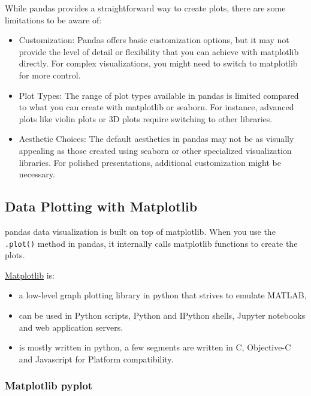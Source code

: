 \documentclass[
  letterpaper,
  DIV=11,
  numbers=noendperiod]{scrreprt}
\providecommand{\tightlist}{%
  \setlength{\itemsep}{0pt}\setlength{\parskip}{0pt}}\usepackage{longtable,booktabs,array}
\begin{document}
While pandas provides a straightforward way to create plots, there are
some limitations to be aware of:

\begin{itemize}
\item
  Customization: Pandas offers basic customization options, but it may
  not provide the level of detail or flexibility that you can achieve
  with matplotlib directly. For complex visualizations, you might need
  to switch to matplotlib for more control.
\item
  Plot Types: The range of plot types available in pandas is limited
  compared to what you can create with matplotlib or seaborn. For
  instance, advanced plots like violin plots or 3D plots require
  switching to other libraries.
\item
  Aesthetic Choices: The default aesthetics in pandas may not be as
  visually appealing as those created using seaborn or other specialized
  visualization libraries. For polished presentations, additional
  customization might be necessary.
\end{itemize}

\hypertarget{data-plotting-with-matplotlib}{%
\subsection{Data Plotting with
Matplotlib}\label{data-plotting-with-matplotlib}}

pandas data visualization is built on top of matplotlib. When you use
the \texttt{.plot()} method in pandas, it internally calls matplotlib
functions to create the plots.

\href{https://matplotlib.org/}{Matplotlib} is:

\begin{itemize}
\tightlist
\item
  a low-level graph plotting library in python that strives to emulate
  MATLAB,
\item
  can be used in Python scripts, Python and IPython shells, Jupyter
  notebooks and web application servers.
\item
  is mostly written in python, a few segments are written in C,
  Objective-C and Javascript for Platform compatibility.
\end{itemize}

\hypertarget{matplotlib-pyplot}{%
\subsubsection{Matplotlib pyplot}\label{matplotlib-pyplot}}
\end{document}

